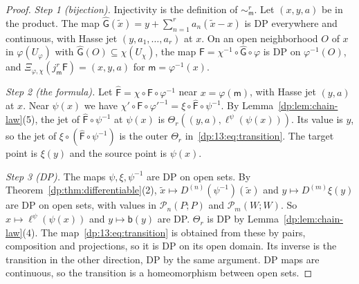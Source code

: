 \documentclass[11pt]{amsart}
\theoremstyle{definition}
\theoremstyle{remark}
\numberwithin{equation}{section}
\theoremstyle{plain}
\theoremstyle{definition}
\theoremstyle{plain}
\newcommand{\cP}{\mathcal P}
\begin{document}
\begin{proof}
\emph{Step 1 (bijection).} Injectivity is the definition of $\sim^r_{\mathsf m}$. Let $(x,y,a)$ be in the product. The map $\hat{\mathsf G}(\tilde x)=y+\sum_{n=1}^ra_n(\tilde x-x)$ is DP everywhere and continuous, with Hasse jet $(y,a_1,\dots,a_r)$ at $x$. On an open neighborhood $O$ of $x$ in $\varphi(U_\varphi)$ with $\hat{\mathsf G}(O)\subseteq\chi(U_\chi)$, the map $\mathsf F=\chi^{-1}\circ\hat{\mathsf G}\circ\varphi$ is DP on $\varphi^{-1}(O)$, and $\Xi_{\varphi,\chi}(j^r_{\mathsf m}\mathsf F)=(x,y,a)$ for $\mathsf m=\varphi^{-1}(x)$.

\emph{Step 2 (the formula).} Let $\hat{\mathsf F}=\chi\circ\mathsf F\circ\varphi^{-1}$ near $x=\varphi(\mathsf m)$, with Hasse jet $(y,a)$ at $x$. Near $\psi(x)$ we have $\chi'\circ\mathsf F\circ\varphi'^{-1}=\xi\circ\hat{\mathsf F}\circ\psi^{-1}$. By Lemma~\ref{dp:lem:chain-law}(5), the jet of $\hat{\mathsf F}\circ\psi^{-1}$ at $\psi(x)$ is $\Theta_r((y,a),\ell^\psi(\psi(x)))$. Its value is $y$, so the jet of $\xi\circ(\hat{\mathsf F}\circ\psi^{-1})$ is the outer $\Theta_r$ in~\eqref{dp:13:eq:transition}. The target point is $\xi(y)$ and the source point is $\psi(x)$.

\emph{Step 3 (DP).} The maps $\psi,\xi,\psi^{-1}$ are DP on open sets. By Theorem~\ref{dp:thm:differentiable}(2), $\tilde x\mapsto D^{(n)}(\psi^{-1})(\tilde x)$ and $y\mapsto D^{(m)}\xi(y)$ are DP on open sets, with values in $\cP_n(P;P)$ and $\cP_m(W;W)$. So $x\mapsto\ell^\psi(\psi(x))$ and $y\mapsto\mathsf b(y)$ are DP. $\Theta_r$ is DP by Lemma~\ref{dp:lem:chain-law}(4). The map~\eqref{dp:13:eq:transition} is obtained from these by pairs, composition and projections, so it is DP on its open domain. Its inverse is the transition in the other direction, DP by the same argument. DP maps are continuous, so the transition is a homeomorphism between open sets.
\end{proof}
\end{document}
